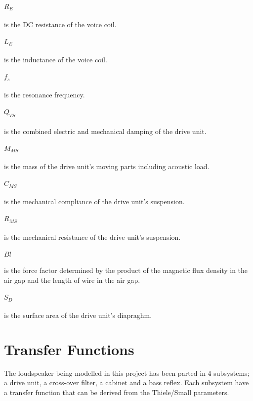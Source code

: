 \paragraph{$R_E$} is the DC resistance of the voice coil.

\paragraph{$L_E$} is the inductance of the voice coil.

\paragraph{$f_s$} is the resonance frequency.

\paragraph{$Q_{TS}$} is the combined electric and mechanical damping of the drive unit.

\paragraph{$M_{MS}$} is the mass of the drive unit's moving parts including acoustic load.

\paragraph{$C_{MS}$} is the mechanical compliance of the drive unit's suspension.

\paragraph{$R_{MS}$} is the mechanical resistance of the drive unit's suspension.

\paragraph{$Bl$} is the force factor determined by the product of the magnetic flux density in the air gap and the length of wire in the air gap.

\paragraph{$S_D$} is the surface area of the drive unit's diapraghm.

\section{Transfer Functions}
The loudspeaker being modelled in this project has been parted in 4 subsystems; a drive unit, a cross-over filter, a cabinet and a bass reflex. 
Each subsystem have a transfer function that can be derived from the Thiele/Small parameters.
